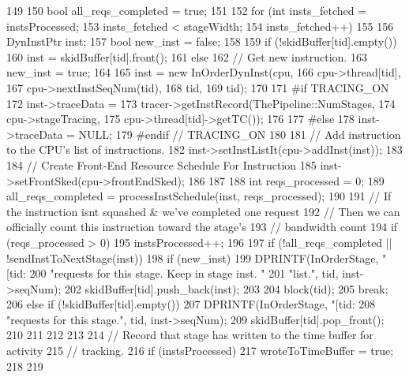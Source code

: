 \begin{DoxyCode}
149 {
150     bool all_reqs_completed = true;
151 
152     for (int insts_fetched = instsProcessed;
153          insts_fetched < stageWidth;
154          insts_fetched++) {
155 
156         DynInstPtr inst;
157         bool new_inst = false;
158 
159         if (!skidBuffer[tid].empty()) {
160             inst = skidBuffer[tid].front();
161         } else {
162             // Get new instruction.
163             new_inst = true;
164 
165             inst = new InOrderDynInst(cpu,
166                                       cpu->thread[tid],
167                                       cpu->nextInstSeqNum(tid),
168                                       tid,
169                                       tid);
170 
171 #if TRACING_ON
172             inst->traceData =
173                 tracer->getInstRecord(ThePipeline::NumStages,
174                                       cpu->stageTracing,
175                                       cpu->thread[tid]->getTC());
176 
177 #else
178             inst->traceData = NULL;
179 #endif      // TRACING_ON
180 
181             // Add instruction to the CPU's list of instructions.
182             inst->setInstListIt(cpu->addInst(inst));
183 
184             // Create Front-End Resource Schedule For Instruction
185             inst->setFrontSked(cpu->frontEndSked);
186         }
187 
188         int reqs_processed = 0;            
189         all_reqs_completed = processInstSchedule(inst, reqs_processed);
190 
191         // If the instruction isnt squashed & we've completed one request
192         // Then we can officially count this instruction toward the stage's 
193         // bandwidth count
194         if (reqs_processed > 0)
195             instsProcessed++;
196 
197         if (!all_reqs_completed || !sendInstToNextStage(inst)) {
198             if (new_inst) {
199                 DPRINTF(InOrderStage, "[tid:%
200                         "requests for this stage. Keep in stage inst. "
201                         "list.\n", tid, inst->seqNum);
202                 skidBuffer[tid].push_back(inst);
203             }
204             block(tid);
205             break;
206         } else if (!skidBuffer[tid].empty()){
207             DPRINTF(InOrderStage, "[tid:%
208                     "requests for this stage.\n", tid, inst->seqNum);
209             skidBuffer[tid].pop_front();
210         }
211 
212     }
213 
214     // Record that stage has written to the time buffer for activity
215     // tracking.
216     if (instsProcessed) {
217         wroteToTimeBuffer = true;
218     }
219 }
\end{DoxyCode}
